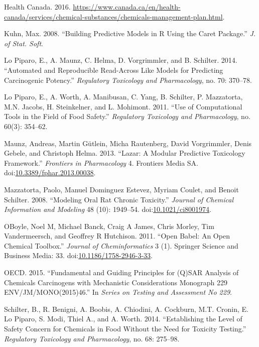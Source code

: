 \documentclass[]{achemso}
\begin{document}
\hypertarget{ref-HealthCanada2016}{}
Health Canada. 2016.
\url{https://www.canada.ca/en/health-canada/services/chemical-substances/chemicals-management-plan.html}.

\hypertarget{ref-Kuhn08}{}
Kuhn, Max. 2008. ``Building Predictive Models in R Using the Caret
Package.'' \emph{J. of Stat. Soft}.

\hypertarget{ref-LoPiparo2014}{}
Lo Piparo, E., A. Maunz, C. Helma, D. Vorgrimmler, and B. Schilter.
2014. ``Automated and Reproducible Read-Across Like Models for
Predicting Carcinogenic Potency.'' \emph{Regulatory Toxicology and
Pharmacology}, no. 70: 370--78.

\hypertarget{ref-LoPiparo2011}{}
Lo Piparo, E., A. Worth, A. Manibusan, C. Yang, B. Schilter, P.
Mazzatorta, M.N. Jacobs, H. Steinkelner, and L. Mohimont. 2011. ``Use of
Computational Tools in the Field of Food Safety.'' \emph{Regulatory
Toxicology and Pharmacology}, no. 60(3): 354--62.

\hypertarget{ref-Maunz2013}{}
Maunz, Andreas, Martin Gütlein, Micha Rautenberg, David Vorgrimmler,
Denis Gebele, and Christoph Helma. 2013. ``Lazar: A Modular Predictive
Toxicology Framework.'' \emph{Frontiers in Pharmacology} 4. Frontiers
Media SA.
doi:\href{https://doi.org/10.3389/fphar.2013.00038}{10.3389/fphar.2013.00038}.

\hypertarget{ref-mazzatorta08}{}
Mazzatorta, Paolo, Manuel Dominguez Estevez, Myriam Coulet, and Benoit
Schilter. 2008. ``Modeling Oral Rat Chronic Toxicity.'' \emph{Journal of
Chemical Information and Modeling} 48 (10): 1949--54.
doi:\href{https://doi.org/10.1021/ci8001974}{10.1021/ci8001974}.

\hypertarget{ref-OBoyle2011}{}
OBoyle, Noel M, Michael Banck, Craig A James, Chris Morley, Tim
Vandermeersch, and Geoffrey R Hutchison. 2011. ``Open Babel: An Open
Chemical Toolbox.'' \emph{Journal of Cheminformatics} 3 (1). Springer
Science and Business Media: 33.
doi:\href{https://doi.org/10.1186/1758-2946-3-33}{10.1186/1758-2946-3-33}.

\hypertarget{ref-OECD2015}{}
OECD. 2015. ``Fundamental and Guiding Principles for (Q)SAR Analysis of
Chemicals Carcinogens with Mechanistic Considerations Monograph 229
ENV/JM/MONO(2015)46.'' In \emph{Series on Testing and Assessment No
229}.

\hypertarget{ref-Schilter2014}{}
Schilter, B., R. Benigni, A. Boobis, A. Chiodini, A. Cockburn, M.T.
Cronin, E. Lo Piparo, S. Modi, Thiel A., and A. Worth. 2014.
``Establishing the Level of Safety Concern for Chemicals in Food Without
the Need for Toxicity Testing.'' \emph{Regulatory Toxicology and
Pharmacology}, no. 68: 275--98.
\end{document}
